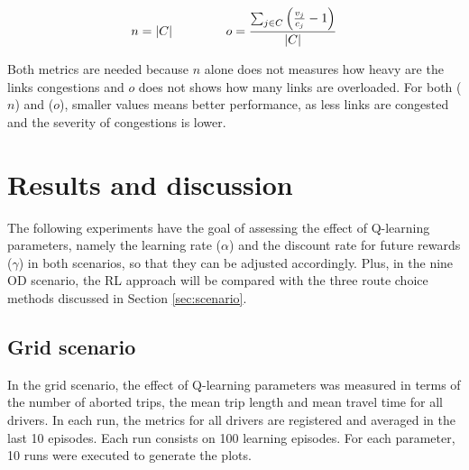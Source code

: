 \documentclass{RITA}
\newcommand{\linkCap}{\ensuremath{c_j}}		%
\newcommand{\veh}{\ensuremath{v}}		%
\newcommand{\congRoads}{\ensuremath{C}}		%
\newcommand{\numCong}{\ensuremath{n}}		%
\newcommand{\overLoadFactor}{\ensuremath{o}}	%
\begin{document}
\begin{equation}
\label{eq:balanceMetrics}
\numCong = |\congRoads| \hspace{1.5cm}  \overLoadFactor = \frac{ \sum_{\substack{j \in \congRoads}} \left(\frac{\veh_j}{\linkCap} -1 \right)}{|C|}
\end{equation}

Both metrics are needed because $n$ alone does not measures how heavy are the links congestions and $o$ does not shows how many links are overloaded. For both ($n$) and ($o$), smaller values means better performance, as less links are congested and the severity of congestions is lower.

\section{Results and discussion}
\label{sec:results}

The following experiments have the goal of assessing the effect of Q-learning parameters, namely the learning rate ($\alpha$) and the discount rate for future rewards ($\gamma$) in both scenarios, so that they can be adjusted accordingly. Plus, in the nine OD scenario, the RL approach will be compared with the three route choice methods discussed in Section \ref{sec:scenario}.


\subsection{Grid scenario}


In the grid scenario, the effect of Q-learning parameters was measured in terms of the number of aborted trips, the mean trip length and mean travel time for all drivers. In each run, the metrics for all drivers are registered and averaged in the last 10 episodes. Each run consists on 100 learning episodes. For each parameter, 10 runs were executed to generate the plots.
\end{document}
